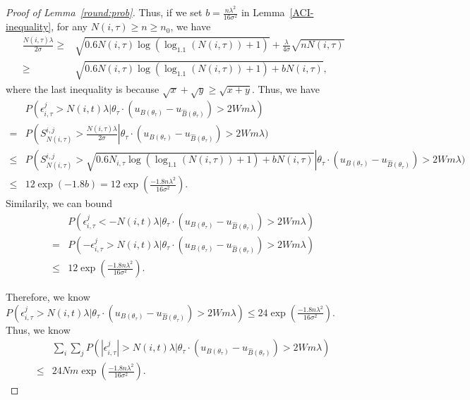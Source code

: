 \documentclass{article}
\begin{document}
\begin{proof}[Proof of Lemma~\ref{round:prob}]
Thus, if we set $b=\frac{n\lambda^2}{16\sigma^2}$ in Lemma~\ref{ACI-inequality}, for any $N(i,\tau)\geq n\geq n_{0}$, we have
\begin{align}
\frac{N(i,\tau)\lambda}{2\sigma}\geq & \sqrt{0.6N(i,\tau)\log(\log_{1.1}(N(i,\tau))+1)}+\frac{\lambda}{4\sigma}\sqrt{n N(i,\tau)} \nonumber \\
\geq & \sqrt{0.6N(i,\tau)\log(\log_{1.1}(N(i,\tau))+1)+bN(i,\tau)}, \nonumber 
\end{align}
where the last inequality is because $\sqrt{x}+\sqrt{y}\geq \sqrt{x+y}$. Thus, we have
\begin{align}
&P(\epsilon_{i,\tau}^{j}>N(i,t)\lambda|\theta_{\tau}\cdot(u_{B(\theta_{\tau})}-u_{\hat{B}(\theta_{\tau})})> 2Wm\lambda) \nonumber \\
=&P\left(S_{N(i,\tau)}^{i,j}>\frac{N(i,\tau)\lambda}{2\sigma}\right|\theta_{\tau}\cdot(u_{B(\theta_{\tau})}-u_{\hat{B}(\theta_{\tau})})> 2Wm\lambda) \nonumber \\
\leq & P\left(S_{N(i,\tau)}^{i,j}> \sqrt{0.6 N_{i,\tau}\log(\log_{1.1}(N(i,\tau))+1)+b N(i,\tau)}\right|\theta_{\tau}\cdot(u_{B(\theta_{\tau})}-u_{\hat{B}(\theta_{\tau})})> 2Wm\lambda) \nonumber \\
\leq & 12\exp( -1.8b) = 12\exp\left(\frac{-1.8 n\lambda^2}{16\sigma^2}\right). \nonumber
\end{align}
Similarily, we can bound 
\begin{align}
&P(\epsilon_{i,\tau}^{j}<-N(i,t)\lambda|\theta_{\tau}\cdot(u_{B(\theta_{\tau})}-u_{\hat{B}(\theta_{\tau})})> 2Wm\lambda) \nonumber \\
=&P(-\epsilon_{i,\tau}^{j}>N(i,t)\lambda|\theta_{\tau}\cdot(u_{B(\theta_{\tau})}-u_{\hat{B}(\theta_{\tau})})> 2Wm\lambda) \nonumber \\
\leq & 12\exp\left(\frac{-1.8 n\lambda^2}{16\sigma^2}\right). \nonumber 
\end{align}

Therefore, we know $P(\epsilon_{i,\tau}^{j}>N(i,t)\lambda|\theta_{\tau}\cdot(u_{B(\theta_{\tau})}-u_{\hat{B}(\theta_{\tau})})> 2Wm\lambda)\leq 24\exp\left(\frac{-1.8 n\lambda^2}{16\sigma^2}\right)$. Thus, we know
\begin{align}
&\sum_{i}\sum_{j} P(|\epsilon_{i,\tau}^{j}|>N(i,t)\lambda|\theta_{\tau}\cdot(u_{B(\theta_{\tau})}-u_{\hat{B}(\theta_{\tau})})> 2Wm\lambda)  \nonumber \\
\leq& 24Nm \exp\left(\frac{-1.8 n\lambda^2}{16\sigma^2}\right). \nonumber
\end{align}

\end{proof}
\end{document}
